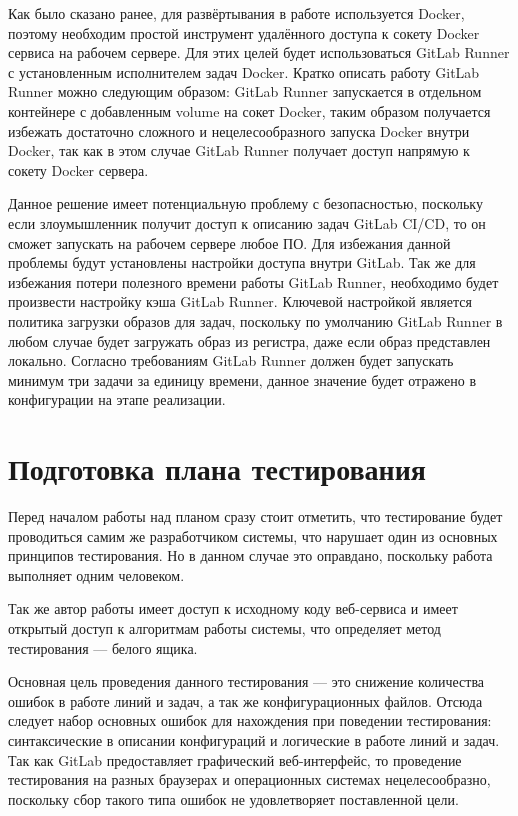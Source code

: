 Как было сказано ранее, для развёртывания в работе используется Docker, поэтому необходим простой инструмент удалённого доступа к сокету Docker сервиса на рабочем сервере.
Для этих целей будет использоваться GitLab Runner с установленным исполнителем задач Docker.
Кратко описать работу GitLab Runner можно следующим образом: GitLab Runner запускается в отдельном контейнере с добавленным volume на сокет Docker,
таким образом получается избежать достаточно сложного и нецелесообразного запуска Docker внутри Docker,
так как в этом случае GitLab Runner получает доступ напрямую к сокету Docker сервера.

Данное решение имеет потенциальную проблему с безопасностью, поскольку если злоумышленник получит доступ к описанию задач GitLab CI/CD, то он сможет запускать на рабочем сервере любое ПО.
Для избежания данной проблемы будут установлены настройки доступа внутри GitLab.
Так же для избежания потери полезного времени работы GitLab Runner, необходимо будет произвести настройку кэша GitLab Runner.
Ключевой настройкой является политика загрузки образов для задач, поскольку по умолчанию GitLab Runner в любом случае будет загружать образ из регистра, даже если образ представлен локально.
Согласно требованиям GitLab Runner должен будет запускать минимум три задачи за единицу времени, данное значение будет отражено в конфигурации на этапе реализации.

\section{Подготовка плана тестирования}

Перед началом работы над планом сразу стоит отметить, что тестирование будет проводиться самим же разработчиком системы, что нарушает один из основных принципов тестирования.
Но в данном случае это оправдано, поскольку работа выполняет одним человеком.

Так же автор работы имеет доступ к исходному коду веб-сервиса и имеет открытый доступ к алгоритмам работы системы, что определяет метод тестирования --- белого ящика.

Основная цель проведения данного тестирования --- это снижение количества ошибок в работе линий и задач, а так же конфигурационных файлов.
Отсюда следует набор основных ошибок для нахождения при поведении тестирования: синтаксические в описании конфигураций и логические в работе линий и задач.
Так как GitLab предоставляет графический веб-интерфейс, то проведение тестирования на разных браузерах и операционных системах нецелесообразно,
поскольку сбор такого типа ошибок не удовлетворяет поставленной цели.

